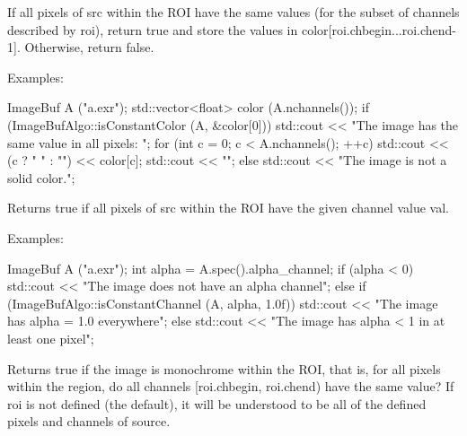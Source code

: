  

If all pixels of {\cf src} within the ROI have the same values (for the
subset of channels described by {\cf roi}), return {\cf true} and store
the values in {\cf color[roi.chbegin...roi.chend-1]}.  Otherwise, return
{\cf false}.

\smallskip
\noindent Examples:
\begin{code}
    ImageBuf A ("a.exr");
    std::vector<float> color (A.nchannels());
    if (ImageBufAlgo::isConstantColor (A, &color[0])) {
        std::cout << "The image has the same value in all pixels: ";
        for (int c = 0;  c < A.nchannels();  ++c)
            std::cout << (c ? " " : "") << color[c];
        std::cout << "\n";
    } else {
        std::cout << "The image is not a solid color.\n";
    }
\end{code}
\apiend


 

Returns {\cf true} if all pixels of {\cf src} within the ROI have the
given {\cf channel} value {\cf val}.

\smallskip
\noindent Examples:
\begin{code}
    ImageBuf A ("a.exr");
    int alpha = A.spec().alpha_channel;
    if (alpha < 0)
        std::cout << "The image does not have an alpha channel\n";
    else if (ImageBufAlgo::isConstantChannel (A, alpha, 1.0f))
        std::cout << "The image has alpha = 1.0 everywhere\n";
    else
        std::cout << "The image has alpha < 1 in at least one pixel\n";
\end{code}
\apiend

 

Returns {\cf true} if the image is monochrome within the ROI, that is,
for all pixels within the region, do all channels 
{\cf [roi.chbegin, roi.chend)}
have the same value?  If roi is not defined (the default), it will be
understood to be all of the defined pixels and channels of source.

